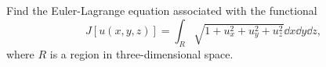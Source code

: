 \documentclass[11pt]{article}
\newcommand{\beq}{\begin{equation}}
\newcommand{\eeq}{\end{equation}}
\newenvironment{statement}
{
    \color{darkgray}
    \ignorespaces
}
{
}
\begin{document}
\renewcommand{\vec}[1]{\mathbf{#1}}
\newcommand{\intr}{\int_R}
\newcommand{\dR}{\partial R}
\newcommand{\dr}{\dd{x} \dd{y} \dd{z}}
\newcommand{\ux}{u_x}
\newcommand{\uy}{u_y}
\newcommand{\uz}{u_z}

\newcommand{\uxx}{u_{xx}}
\newcommand{\uyx}{u_{yx}}
\newcommand{\uzx}{u_{zx}}

\newcommand{\uxy}{u_{xy}}
\newcommand{\uyy}{u_{yy}}
\newcommand{\uzy}{u_{zy}}

\newcommand{\uxz}{u_{xz}}
\newcommand{\uyz}{u_{yz}}
\newcommand{\uzz}{u_{zz}}

\newcommand{\Ld}{\mathcal{L}}

\section{}
\begin{statement}
	Find the Euler-Lagrange equation associated with the functional
	\beq
		J[u(x, y, z)] = \intr \sqrt{1 + \ux^2 + \uy^2 + \uz^2} \dr,
	\eeq
	where $R$ is a region in three-dimensional space.
\end{statement}
\end{document}
